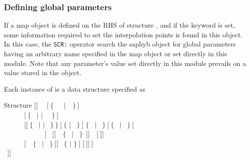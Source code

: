\subsubsection{Defining global parameters}\label{sect:descints}

\vskip -0.5cm

If a {\sc map} object is defined on the RHS of structure , and if the  keyword is set, some information required to set the interpolation points is found in this object.
In this case, the {\tt SCR:} operator search the {\sc saphyb} object for global parameters  having an arbitrary name specified in the {\sc map} object or set directly in this module.
Note that any parameter's value set directly in this module prevails on a value stored in the  object.

Each instance of  is a data structure specified as

\begin{DataStructure}{Structure }
$[[$~ ~$[~\{$~~~$|$~~$\}~]$ \\
~~~~~~$[~\{$~ $|$  $|$ ~~$\}~]$ \\
~~~~~~$[[~\{$~ $|$  $|$ ~$\}~\}~[~\{$  $|$ ~$\}~]$  $\{$~ $|$ ~$\}~[~\{$~ $|$ ~$\}~]$ \\
~~~~~~~~~~~~$[$~ $[[$~~$\{$~ $|$ ~$\}$~$]]$~~$]~]]$  \\
~~~~~~$[$~~$\{$~ $|$ ~$\}~[[$~ $\{$  $|$ \moc{*} $\}~[$  $]~]]~]$ \\
~$]]$
\end{DataStructure}

